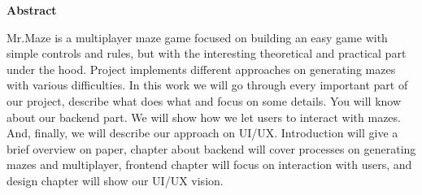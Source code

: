 \newpage
\pagestyle{plain}

\begin{center}
    \Large
    \textbf{Abstract}
\end{center}
Mr.Maze is a multiplayer maze game focused on building an easy game with simple controls and rules, but with the interesting theoretical and practical part under the hood. Project implements different approaches on generating mazes with various difficulties. In this work we will go through every important part of our project, describe what does what and focus on some details. You will know about our backend part. We will show how we let users to interact with mazes. And, finally, we will describe our approach on UI/UX. Introduction will give a brief overview on paper, chapter about backend will cover processes on generating mazes and multiplayer, frontend chapter will focus on interaction with users, and design chapter will show our UI/UX vision.